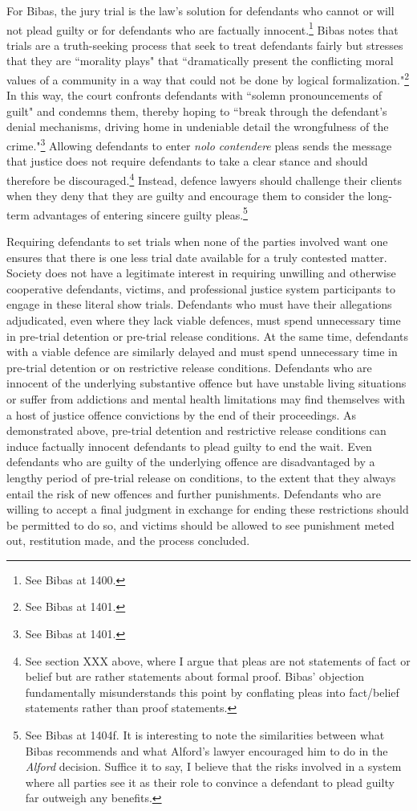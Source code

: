 For Bibas, the jury trial is the law's solution for defendants who cannot or will not plead guilty or for defendants who are factually innocent.\footnote{See Bibas at 1400.} Bibas notes that trials are a truth-seeking process that seek to treat defendants fairly but stresses that they are ``morality plays" that ``dramatically present the conflicting moral values of a community in a way that could not be done by logical formalization."\footnote{See Bibas at 1401.} In this way, the court confronts defendants with ``solemn pronouncements of guilt" and condemns them, thereby hoping to ``break through the defendant's denial mechanisms, driving home in undeniable detail the wrongfulness of the crime."\footnote{See Bibas at 1401.} Allowing defendants to enter \textit{nolo contendere} pleas sends the message that justice does not require defendants to take a clear stance and should therefore be discouraged.\footnote{See section XXX above, where I argue that pleas are not statements of fact or belief but are rather statements about formal proof. Bibas' objection fundamentally misunderstands this point by conflating pleas into fact/belief statements rather than proof statements.} Instead, defence lawyers should challenge their clients when they deny that they are guilty and encourage them to consider the long-term advantages of entering sincere guilty pleas.\footnote{See Bibas at 1404f. It is interesting to note the similarities between what Bibas recommends and what Alford's lawyer encouraged him to do in the \textit{Alford} decision. Suffice it to say, I believe that the risks involved in a system where all parties see it as their role to convince a defendant to plead guilty far outweigh any benefits.}

Requiring defendants to set trials when none of the parties involved want one ensures that there is one less trial date available for a truly contested matter. Society does not have a legitimate interest in requiring unwilling and otherwise cooperative defendants, victims, and professional justice system participants to engage in these literal show trials. Defendants who must have their allegations adjudicated, even where they lack viable defences, must spend unnecessary time in pre-trial detention or pre-trial release conditions. At the same time, defendants with a viable defence are similarly delayed and must spend unnecessary time in pre-trial detention or on restrictive release conditions. Defendants who are innocent of the underlying substantive offence but have unstable living situations or suffer from addictions and mental health limitations may find themselves with a host of justice offence convictions by the end of their proceedings. As demonstrated above, pre-trial detention and restrictive release conditions can induce factually innocent defendants to plead guilty to end the wait. Even defendants who are guilty of the underlying offence are disadvantaged by a lengthy period of pre-trial release on conditions, to the extent that they always entail the risk of new offences and further punishments. Defendants who are willing to accept a final judgment in exchange for ending these restrictions should be permitted to do so, and victims should be allowed to see punishment meted out, restitution made, and the process concluded. 